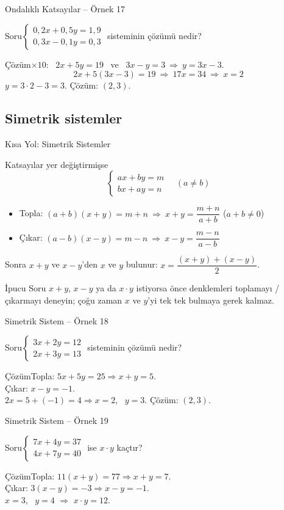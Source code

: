 \documentclass[aspectratio=169,11pt,handout]{beamer}
\newcommand{\soru}[3]{%
\begin{frame}{#1}
  \begin{block}{Soru}\large #2\end{block}
  \pause
  \begin{exampleblock}{Çözüm}\large #3\end{exampleblock}
\end{frame}}
\begin{document}
\soru{Ondalıklı Katsayılar -- Örnek 17}
{\(\begin{cases}0{,}2x+0{,}5y=1{,}9\\ 0{,}3x-0{,}1y=0{,}3\end{cases}\) \quad sisteminin çözümü nedir?}
{\(\times 10\): \ \(2x+5y=19\) \ ve \ \(3x-y=3\ \Rightarrow\ y=3x-3\).
\[2x+5(3x-3)=19\ \Rightarrow\ 17x=34\ \Rightarrow\ x=2\]
\(y=3\cdot 2-3=3\). \quad Çözüm: \((2,3)\).}

\subsection{Simetrik sistemler}
\begin{frame}{Kısa Yol: Simetrik Sistemler}
\begin{block}{Katsayılar yer değiştirmişse}
\[\begin{cases}ax+by=m\\ bx+ay=n\end{cases}\quad(a\neq b)\]
\begin{itemize}
\item Topla: \((a+b)(x+y)=m+n\ \Rightarrow\ x+y=\dfrac{m+n}{a+b}\) \quad (\(a+b\neq 0\))
\item Çıkar: \((a-b)(x-y)=m-n\ \Rightarrow\ x-y=\dfrac{m-n}{a-b}\)
\end{itemize}
Sonra \(x+y\) ve \(x-y\)'den \(x\) ve \(y\) bulunur: \(x=\dfrac{(x+y)+(x-y)}{2}\).
\end{block}
\begin{alertblock}{İpucu}
Soru \(x+y\), \(x-y\) ya da \(x\cdot y\) istiyorsa önce denklemleri toplamayı / çıkarmayı deneyin; çoğu zaman \(x\) ve \(y\)'yi tek tek bulmaya gerek kalmaz.
\end{alertblock}
\end{frame}

\soru{Simetrik Sistem -- Örnek 18}
{\(\begin{cases}3x+2y=12\\ 2x+3y=13\end{cases}\) \quad sisteminin çözümü nedir?}
{Topla: \(5x+5y=25\Rightarrow x+y=5\).\\[3pt]
Çıkar: \(x-y=-1\).\\[3pt]
\(2x=5+(-1)=4\Rightarrow x=2\), \ \(y=3\). \quad Çözüm: \((2,3)\).}

\soru{Simetrik Sistem -- Örnek 19}
{\(\begin{cases}7x+4y=37\\ 4x+7y=40\end{cases}\) \quad ise \(x\cdot y\) kaçtır?}
{Topla: \(11(x+y)=77\Rightarrow x+y=7\).\\[3pt]
Çıkar: \(3(x-y)=-3\Rightarrow x-y=-1\).\\[3pt]
\(x=3\), \ \(y=4\) \(\Rightarrow\) \(x\cdot y=12\).}
\end{document}
